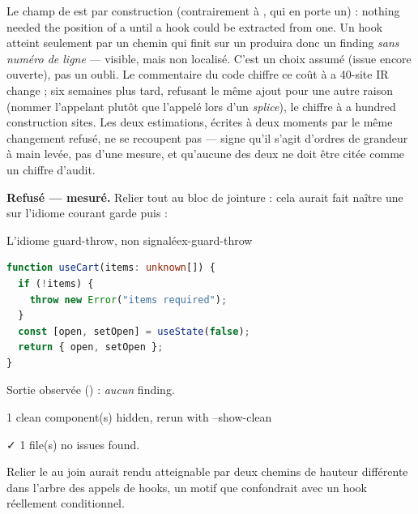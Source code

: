 
\begin{piege}
Le champ  de  est  par
construction (contrairement à , qui en porte un) : \og nothing
needed the position of a  until a hook could be extracted from
one\fg{}. Un hook atteint seulement par un chemin qui finit sur un
 produira donc un finding \emph{sans numéro de ligne} ---
visible, mais non localisé. C'est un choix assumé (issue  encore
ouverte), pas un oubli. Le commentaire du code chiffre ce coût à \og a 40-site
IR change\fg{} ; six semaines plus tard, refusant le même ajout pour une
autre raison (nommer l'appelant plutôt que l'appelé lors d'un \emph{splice}),
 le chiffre à \og a hundred construction sites\fg{}. Les deux
estimations, écrites à deux moments par le même changement refusé, ne se
recoupent pas --- signe qu'il s'agit d'ordres de grandeur à main levée, pas
d'une mesure, et qu'aucune des deux ne doit être citée comme un chiffre
d'audit.
\end{piege}

\textbf{Refusé --- mesuré.} Relier tout  au bloc de
jointure : cela aurait fait naître une \Error{}  sur
l'idiome courant \og garde puis \fg{} :

\begin{exemple}{L'idiome guard-throw, non signalé}{ex-guard-throw}
\begin{lstlisting}[language=TypeScript,caption={\code{useCart} : garde par exception avant les hooks}]
function useCart(items: unknown[]) {
  if (!items) {
    throw new Error("items required");
  }
  const [open, setOpen] = useState(false);
  return { open, setOpen };
}
\end{lstlisting}
Sortie observée (\code{\snapshotCommit}) : \emph{aucun} finding.
\begin{sortie}
   1 clean component(s) hidden, rerun with --show-clean

✓  1 file(s) no issues found.
\end{sortie}
Relier le  au join aurait rendu  atteignable par
deux chemins de hauteur différente dans l'arbre des appels de hooks, un motif
que  confondrait avec un hook réellement conditionnel.
\end{exemple}

